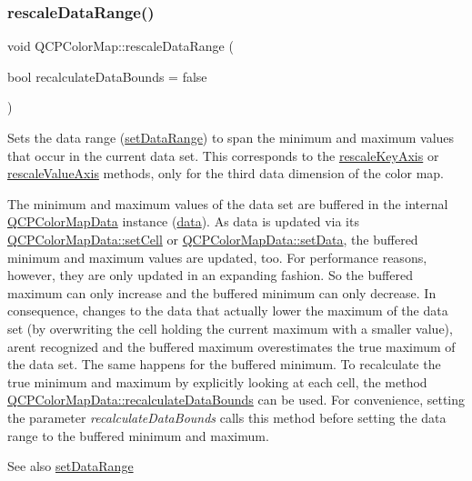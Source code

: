 \subsubsection{\texorpdfstring{rescale\+Data\+Range()}{rescaleDataRange()}}
{\footnotesize\ttfamily void Q\+C\+P\+Color\+Map\+::rescale\+Data\+Range (\begin{DoxyParamCaption}\item[{bool}]{recalculate\+Data\+Bounds = {\ttfamily false} }\end{DoxyParamCaption})}

Sets the data range (\hyperlink{classQCPColorMap_a980b42837821159786a85b4b7dcb8774}{set\+Data\+Range}) to span the minimum and maximum values that occur in the current data set. This corresponds to the \hyperlink{classQCPAbstractPlottable_ae96b83c961e257da116c6acf9c7da308}{rescale\+Key\+Axis} or \hyperlink{classQCPAbstractPlottable_a714eaf36b12434cd71846215504db82e}{rescale\+Value\+Axis} methods, only for the third data dimension of the color map.

The minimum and maximum values of the data set are buffered in the internal \hyperlink{classQCPColorMapData}{Q\+C\+P\+Color\+Map\+Data} instance (\hyperlink{classQCPColorMap_a047d7eb3ae657f93f2f39b5e68b79451}{data}). As data is updated via its \hyperlink{classQCPColorMapData_a8e75eaf8746596319032a93f3d2d0683}{Q\+C\+P\+Color\+Map\+Data\+::set\+Cell} or \hyperlink{classQCPColorMapData_afd2083ccfd6987ec94aa7ef8e91ca39a}{Q\+C\+P\+Color\+Map\+Data\+::set\+Data}, the buffered minimum and maximum values are updated, too. For performance reasons, however, they are only updated in an expanding fashion. So the buffered maximum can only increase and the buffered minimum can only decrease. In consequence, changes to the data that actually lower the maximum of the data set (by overwriting the cell holding the current maximum with a smaller value), aren\textquotesingle{}t recognized and the buffered maximum overestimates the true maximum of the data set. The same happens for the buffered minimum. To recalculate the true minimum and maximum by explicitly looking at each cell, the method \hyperlink{classQCPColorMapData_ab235ade8a4d64bd3adb26a99b3dd57ee}{Q\+C\+P\+Color\+Map\+Data\+::recalculate\+Data\+Bounds} can be used. For convenience, setting the parameter {\itshape recalculate\+Data\+Bounds} calls this method before setting the data range to the buffered minimum and maximum.

\begin{DoxySeeAlso}{See also}
\hyperlink{classQCPColorMap_a980b42837821159786a85b4b7dcb8774}{set\+Data\+Range} 
\end{DoxySeeAlso}
\mbox{\label{classQCPColorMap_afb4b843596addf58096082827a9e3450}} 
